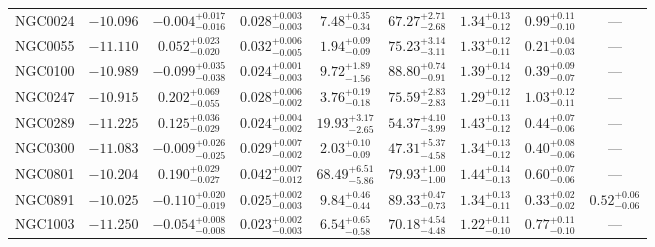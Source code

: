 \documentclass[twocolumn,tighten]{aastex63}
\begin{document}
\begin{table}
\begin{center}
\begin{tabular}{lcccccccc}
    NGC0024 & $ -10.096 $ & $ -0.004 _{ -0.016 } ^{ + 0.017 } $ & $ 0.028 _{ -0.003 } ^{ + 0.003 } $ & $ 7.48 _{ -0.34 } ^{ + 0.35 } $ & $ 67.27 _{ -2.68 } ^{ + 2.71 } $ & $ 1.34 _{ -0.12 } ^{ + 0.13 } $ & $ 0.99 _{ -0.10 } ^{ + 0.11 } $ & --- \\  
    NGC0055 & $ -11.110 $ & $ 0.052 _{ -0.020 } ^{ + 0.023 } $ & $ 0.032 _{ -0.005 } ^{ + 0.006 } $ & $ 1.94 _{ -0.09 } ^{ + 0.09 } $ & $ 75.23 _{ -3.11 } ^{ + 3.14 } $ & $ 1.33 _{ -0.11 } ^{ + 0.12 } $ & $ 0.21 _{ -0.03 } ^{ + 0.04 } $ & --- \\  
    NGC0100 & $ -10.989 $ & $ -0.099 _{ -0.038 } ^{ + 0.035 } $ & $ 0.024 _{ -0.003 } ^{ + 0.001 } $ & $ 9.72 _{ -1.56 } ^{ + 1.89 } $ & $ 88.80 _{ -0.91 } ^{ + 0.74 } $ & $ 1.39 _{ -0.12 } ^{ + 0.14 } $ & $ 0.39 _{ -0.07 } ^{ + 0.09 } $ & --- \\  
    NGC0247 & $ -10.915 $ & $ 0.202 _{ -0.055 } ^{ + 0.069 } $ & $ 0.028 _{ -0.002 } ^{ + 0.006 } $ & $ 3.76 _{ -0.18 } ^{ + 0.19 } $ & $ 75.59 _{ -2.83 } ^{ + 2.83 } $ & $ 1.29 _{ -0.11 } ^{ + 0.12 } $ & $ 1.03 _{ -0.11 } ^{ + 0.12 } $ & --- \\  
    NGC0289 & $ -11.225 $ & $ 0.125 _{ -0.029 } ^{ + 0.036 } $ & $ 0.024 _{ -0.002 } ^{ + 0.004 } $ & $ 19.93 _{ -2.65 } ^{ + 3.17 } $ & $ 54.37 _{ -3.99 } ^{ + 4.10 } $ & $ 1.43 _{ -0.12 } ^{ + 0.13 } $ & $ 0.44 _{ -0.06 } ^{ + 0.07 } $ & --- \\  
    NGC0300 & $ -11.083 $ & $ -0.009 _{ -0.025 } ^{ + 0.026 } $ & $ 0.029 _{ -0.002 } ^{ + 0.007 } $ & $ 2.03 _{ -0.09 } ^{ + 0.10 } $ & $ 47.31 _{ -4.58 } ^{ + 5.37 } $ & $ 1.34 _{ -0.12 } ^{ + 0.13 } $ & $ 0.40 _{ -0.06 } ^{ + 0.08 } $ & --- \\  
    NGC0801 & $ -10.204 $ & $ 0.190 _{ -0.027 } ^{ + 0.029 } $ & $ 0.042 _{ -0.012 } ^{ + 0.007 } $ & $ 68.49 _{ -5.86 } ^{ + 6.51 } $ & $ 79.93 _{ -1.00 } ^{ + 1.00 } $ & $ 1.44 _{ -0.13 } ^{ + 0.14 } $ & $ 0.60 _{ -0.06 } ^{ + 0.07 } $ & --- \\  
    NGC0891 & $ -10.025  $ & $ -0.110 _{ -0.019 } ^{ + 0.020 } $ & $ 0.025 _{ -0.003 } ^{ + 0.002 } $ & $ 9.84 _{ -0.44 } ^{ + 0.46 } $ & $ 89.33 _{ -0.73 } ^{ + 0.47 } $ & $ 1.34 _{ -0.11 } ^{ + 0.13 } $ & $ 0.33 _{ -0.02 } ^{ + 0.02 } $ & $ 0.52 _{ -0.06 } ^{ + 0.06 } $  \\  
    NGC1003 & $ -11.250 $ & $ -0.054 _{ -0.008 } ^{ + 0.008 } $ & $ 0.023 _{ -0.003 } ^{ + 0.002 } $ & $ 6.54 _{ -0.58 } ^{ + 0.65 } $ & $ 70.18 _{ -4.48 } ^{ + 4.54 } $ & $ 1.22 _{ -0.10 } ^{ + 0.11 } $ & $ 0.77 _{ -0.10 } ^{ + 0.11 } $ & --- \\  

\end{tabular}
\end{center}
\end{table}
\end{document}
